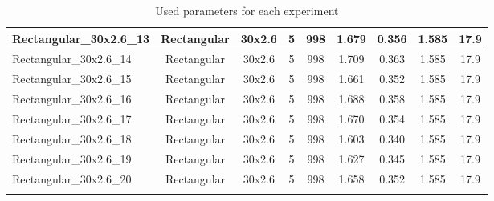 \begin{table}
\begin{adjustbox}{max width = \linewidth}
\begin{tabular}{lcccccccc}
\multicolumn{1}{|l|}{Rectangular\_30x2.6\_13} & \multicolumn{1}{c|}{Rectangular} & \multicolumn{1}{c|}{30x2.6} & \multicolumn{1}{c|}{5} & \multicolumn{1}{c|}{998} & \multicolumn{1}{c|}{1.679} & \multicolumn{1}{c|}{0.356} & \multicolumn{1}{c|}{1.585} & \multicolumn{1}{c|}{17.9} \\ \hline
\multicolumn{1}{|l|}{Rectangular\_30x2.6\_14} & \multicolumn{1}{c|}{Rectangular} & \multicolumn{1}{c|}{30x2.6} & \multicolumn{1}{c|}{5} & \multicolumn{1}{c|}{998} & \multicolumn{1}{c|}{1.709} & \multicolumn{1}{c|}{0.363} & \multicolumn{1}{c|}{1.585} & \multicolumn{1}{c|}{17.9} \\ \hline
\multicolumn{1}{|l|}{Rectangular\_30x2.6\_15} & \multicolumn{1}{c|}{Rectangular} & \multicolumn{1}{c|}{30x2.6} & \multicolumn{1}{c|}{5} & \multicolumn{1}{c|}{998} & \multicolumn{1}{c|}{1.661} & \multicolumn{1}{c|}{0.352} & \multicolumn{1}{c|}{1.585} & \multicolumn{1}{c|}{17.9} \\ \hline
\multicolumn{1}{|l|}{Rectangular\_30x2.6\_16} & \multicolumn{1}{c|}{Rectangular} & \multicolumn{1}{c|}{30x2.6} & \multicolumn{1}{c|}{5} & \multicolumn{1}{c|}{998} & \multicolumn{1}{c|}{1.688} & \multicolumn{1}{c|}{0.358} & \multicolumn{1}{c|}{1.585} & \multicolumn{1}{c|}{17.9} \\ \hline
\multicolumn{1}{|l|}{Rectangular\_30x2.6\_17} & \multicolumn{1}{c|}{Rectangular} & \multicolumn{1}{c|}{30x2.6} & \multicolumn{1}{c|}{5} & \multicolumn{1}{c|}{998} & \multicolumn{1}{c|}{1.670} & \multicolumn{1}{c|}{0.354} & \multicolumn{1}{c|}{1.585} & \multicolumn{1}{c|}{17.9} \\ \hline
\multicolumn{1}{|l|}{Rectangular\_30x2.6\_18} & \multicolumn{1}{c|}{Rectangular} & \multicolumn{1}{c|}{30x2.6} & \multicolumn{1}{c|}{5} & \multicolumn{1}{c|}{998} & \multicolumn{1}{c|}{1.603} & \multicolumn{1}{c|}{0.340} & \multicolumn{1}{c|}{1.585} & \multicolumn{1}{c|}{17.9} \\ \hline
\multicolumn{1}{|l|}{Rectangular\_30x2.6\_19} & \multicolumn{1}{c|}{Rectangular} & \multicolumn{1}{c|}{30x2.6} & \multicolumn{1}{c|}{5} & \multicolumn{1}{c|}{998} & \multicolumn{1}{c|}{1.627} & \multicolumn{1}{c|}{0.345} & \multicolumn{1}{c|}{1.585} & \multicolumn{1}{c|}{17.9} \\ \hline
\multicolumn{1}{|l|}{Rectangular\_30x2.6\_20} & \multicolumn{1}{c|}{Rectangular} & \multicolumn{1}{c|}{30x2.6} & \multicolumn{1}{c|}{5} & \multicolumn{1}{c|}{998} & \multicolumn{1}{c|}{1.658} & \multicolumn{1}{c|}{0.352} & \multicolumn{1}{c|}{1.585} & \multicolumn{1}{c|}{17.9} \\ \hline
 & \multicolumn{1}{l}{} & \multicolumn{1}{l}{} & \multicolumn{1}{l}{} & \multicolumn{1}{l}{} & \multicolumn{1}{l}{} & \multicolumn{1}{l}{} & \multicolumn{1}{l}{} & \multicolumn{1}{l}{}

\end{tabular}
\end{adjustbox}
\caption{Used parameters for each experiment}
\label{tab:ex_plan}
\end{table}









